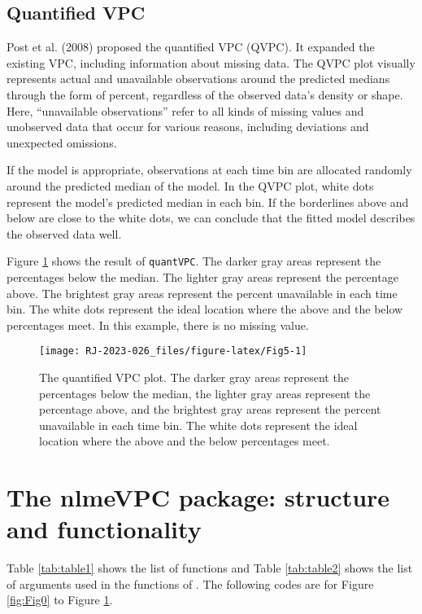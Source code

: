 \hypertarget{quantified-vpc}{%
\subsection{Quantified VPC}\label{quantified-vpc}}

Post et al. (2008) proposed the quantified VPC (QVPC). It expanded the existing VPC, including information about missing data.
The QVPC plot visually represents actual and unavailable observations around the predicted medians through the form of percent, regardless of the observed data's density or shape. Here, ``unavailable observations'' refer to all kinds of missing values and unobserved data that occur for various reasons, including deviations and unexpected omissions.

If the model is appropriate, observations at each time bin are allocated randomly around the predicted median of the model. In the QVPC plot, white dots represent the model's predicted median in each bin. If the borderlines above and below are close to the white dots, we can conclude that the fitted model describes the observed data well.

Figure \ref{fig:Fig5} shows the result of \texttt{quantVPC}. The darker gray areas represent the percentages below the median. The lighter gray areas represent the percentage above. The brightest gray areas represent the percent unavailable in each time bin. The white dots represent the ideal location where the above and the below percentages meet. In this example, there is no missing value.

\begin{figure}
\texttt{[image: RJ-2023-026\_files/figure-latex/Fig5-1]} \caption{The quantified VPC plot. The darker gray areas represent the percentages below the median, the lighter gray areas represent the percentage above, and the brightest gray areas represent the percent unavailable in each time bin. The white dots represent the ideal location where the above and the below percentages meet.}\label{fig:Fig5}
\end{figure}

\hypertarget{the-nlmevpc-package-structure-and-functionality}{%
\section{The nlmeVPC package: structure and functionality}\label{the-nlmevpc-package-structure-and-functionality}}

Table \ref{tab:table1} shows the list of functions and Table \ref{tab:table2} shows the list of arguments used in the functions of . The following codes are for Figure \ref{fig:Fig0} to Figure \ref{fig:Fig5}.

